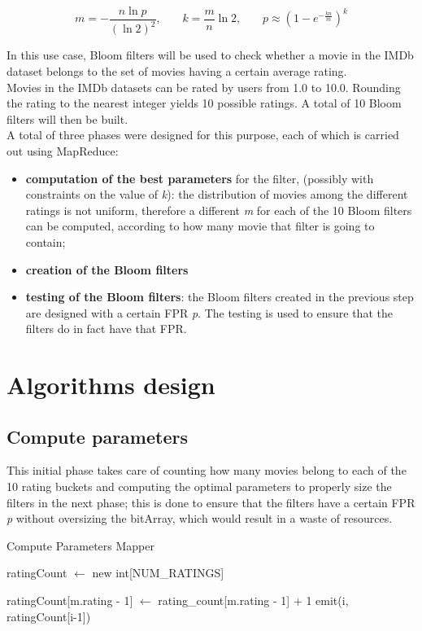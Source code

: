 \begin{equation}\label{eq:parameters}
m = - \frac{n \ln p}{(\ln 2)^{2}} 
   \text{,}\quad\quad 
k = \frac{m}{n} \ln 2
\text{,}\quad\quad
p \approx (1-e^{-\frac{kn}{m}})^{k}
\end{equation}

\noindent In this use case, Bloom filters will be used to check whether a movie in the IMDb dataset belongs to the set of movies having a certain average rating.\\
Movies in the IMDb datasets can be rated by users from 1.0 to 10.0. Rounding the rating to the nearest integer yields 10 possible ratings.
A total of 10 Bloom filters will then be built.\\

\noindent A total of three phases were designed for this purpose, each of which is carried out using MapReduce:
\begin{itemize}
	\item \textbf{computation of the best parameters} for the filter, (possibly with constraints on the value of \textit{k}): the distribution of movies among the different ratings is not uniform, therefore a different \textit{m} for each of the 10 Bloom filters can be computed, according to how many movie that filter is going to contain;
	\item \textbf{creation of the Bloom filters}
	\item \textbf{testing of the Bloom filters}: the Bloom filters created in the previous step are designed with a certain FPR \textit{p}. The testing is used to ensure that the filters do in fact have that FPR.
\end{itemize}

\section{Algorithms design}

\subsection{Compute parameters}
This initial phase takes care of counting how many movies belong to each of the 10 rating buckets and computing the optimal parameters to properly size the filters in the next phase; this is done to ensure that the filters have a certain FPR \textit{p} without oversizing the bitArray, which would result in a waste of resources.

\begin{algorithm}[H]
	\caption{Compute Parameters Mapper} 
	\begin{algorithmic}[1]
			\State ratingCount $\gets$ new int[NUM\_RATINGS]
			
				\State ratingCount[m.rating - 1] $\gets$ rating\_count[m.rating - 1] + 1
			\EndFor
				\State emit(i, ratingCount[i-1])
			\EndFor
		\EndProcedure
	\end{algorithmic} 
\end{algorithm}

